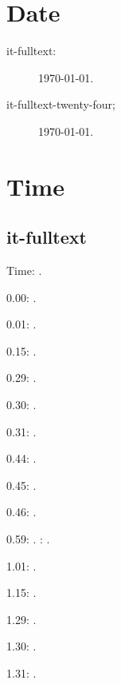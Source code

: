 \documentclass[italian]{article}
\begin{document}
\section{Date}

\begin{description}
\item[it-fulltext:]
\today.

\item[it-fulltext-twenty-four;]
\today.


\end{description}

\section{Time}
\subsection{it-fulltext}
Time: \DTMcurrenttime.

0.00:  .

0.01:   . 

0.15:   . 

0.29:   . 

0.30:   .

0.31:   .

0.44:   .

0.45:   .

0.46:   .

0.59:   .
:  .

1.01:   . 

1.15:   . 

1.29:   . 

1.30:   .

1.31:   .
\end{document}
